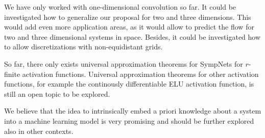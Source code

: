 \documentclass[twoside,a4paper]{article}
\begin{document}
We have only worked with one-dimensional convolution so far. It could be investigated
how to generalize our proposal for two and three dimensions. This would add
even more application areas, as it would allow to predict the
flow for two and three dimensional systems in space. Besides, it could be investigated
how to allow discretizations with non-equidistant grids.

So far, there only exists universal approximation theorems for SympNets 
for $r$-finite activation functions.
Universal approximation theorems for other activation functions, for example
the continously differentiable ELU activation function, is still an open topic to be explored.

We believe that the idea to intrinsically embed a priori knowledge about a system
into a machine learning model is very promising and should be further explored
also in other contexts.
\end{document}
